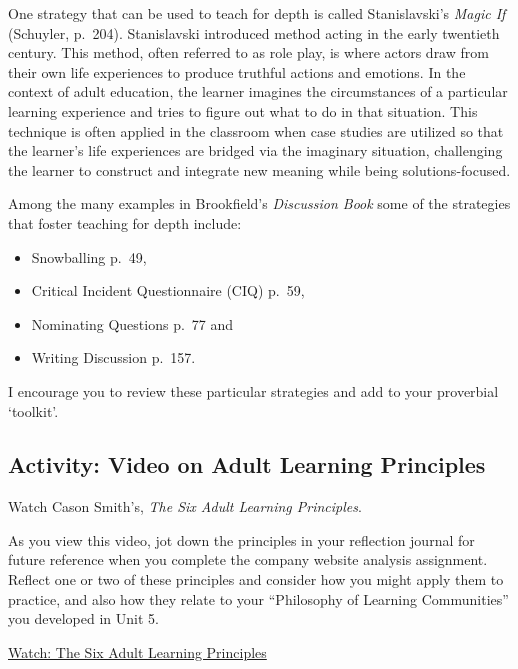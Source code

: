 \documentclass[
]{book}
\providecommand{\tightlist}{%
  \setlength{\itemsep}{0pt}\setlength{\parskip}{0pt}}
\begin{document}
One strategy that can be used to teach for depth is called
Stanislavski's \emph{Magic If} (Schuyler, p.~204). Stanislavski introduced
method acting in the early twentieth century. This method, often
referred to as role play, is where actors draw from their own life
experiences to produce truthful actions and emotions. In the context of
adult education, the learner imagines the circumstances of a particular
learning experience and tries to figure out what to do in that
situation. This technique is often applied in the classroom when case
studies are utilized so that the learner's life experiences are bridged
via the imaginary situation, challenging the learner to construct and
integrate new meaning while being solutions-focused.

Among the many examples in Brookfield's \emph{Discussion Book} some of the strategies that foster teaching for depth include:

\begin{itemize}
\tightlist
\item
  Snowballing p.~49,\\
\item
  Critical Incident Questionnaire (CIQ) p.~59,\\
\item
  Nominating Questions p.~77 and\\
\item
  Writing Discussion p.~157.
\end{itemize}

I encourage you to review these particular strategies and add to your proverbial `toolkit'.

\hypertarget{activity-video-on-adult-learning-principles}{%
\subsection*{Activity: Video on Adult Learning Principles}\label{activity-video-on-adult-learning-principles}}

\begin{reflect}
Watch Cason Smith's, \emph{The Six Adult Learning Principles}.

As you view this video, jot down the principles in your reflection journal for future reference when you complete the company website analysis assignment. Reflect one or two of these principles and consider how you might apply them to practice, and also how they relate to your ``Philosophy of Learning Communities'' you developed in Unit 5.

\href{https://www.youtube.com/watch?v=vLJ7cRwKI-I}{Watch: The Six Adult Learning Principles}
\end{reflect}
\end{document}
